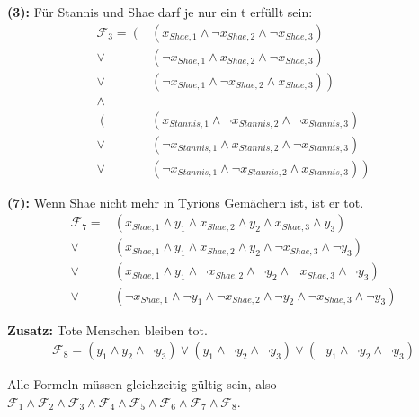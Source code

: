 \documentclass{article}
\begin{document}
\textbf{(3): }Für Stannis und Shae darf je nur ein t erfüllt sein:
\begin{align*}
\mathcal{F}_3 = \left(\right. & \left(x_{Shae,1} \wedge \neg x_{Shae,2} \wedge \neg x_{Shae,3} \right) \\ 
                         \vee & \left(\neg x_{Shae,1} \wedge x_{Shae,2} \wedge \neg x_{Shae,3} \right) \\ 
                         \vee & \left(\neg x_{Shae,1} \wedge \neg x_{Shae,2} \wedge x_{Shae,3} \right) \left.\right)\\
                       \wedge & \\
                \left(\right. & \left(x_{Stannis,1} \wedge \neg x_{Stannis,2} \wedge \neg x_{Stannis,3} \right) \\ 
                         \vee & \left(\neg x_{Stannis,1} \wedge x_{Stannis,2} \wedge \neg x_{Stannis,3} \right) \\ 
                         \vee & \left(\neg x_{Stannis,1} \wedge \neg x_{Stannis,2} \wedge x_{Stannis,3} \right) \left.\right)
\end{align*}

\textbf{(7): }Wenn Shae nicht mehr in Tyrions Gemächern ist, ist er tot.
\begin{align*}
\mathcal{F}_7 = & \left(x_{Shae,1} \wedge y_1 \wedge x_{Shae,2} \wedge y_2 \wedge x_{Shae,3} \wedge y_3 \right) \\
           \vee & \left(x_{Shae,1} \wedge y_1 \wedge x_{Shae,2} \wedge y_2 \wedge \neg x_{Shae,3} \wedge \neg y_3 \right) \\
           \vee & \left(x_{Shae,1} \wedge y_1 \wedge \neg x_{Shae,2} \wedge \neg y_2 \wedge \neg x_{Shae,3} \wedge \neg y_3 \right) \\
           \vee & \left(\neg x_{Shae,1} \wedge \neg y_1 \wedge \neg x_{Shae,2} \wedge \neg y_2 \wedge \neg x_{Shae,3} \wedge \neg y_3 \right)
\end{align*}

\textbf{Zusatz: }Tote Menschen bleiben tot.
\begin{align*}
\mathcal{F}_8 = \left(y_1 \wedge y_2 \wedge \neg y_3\right) \vee \left(y_1 \wedge \neg y_2 \wedge \neg y_3\right) \vee \left(\neg y_1 \wedge \neg y_2 \wedge \neg y_3\right)
\end{align*}


Alle Formeln müssen gleichzeitig gültig sein, also $\mathcal{F}_1 \wedge \mathcal{F}_2 \wedge \mathcal{F}_3 \wedge \mathcal{F}_4 \wedge \mathcal{F}_5 \wedge \mathcal{F}_6 \wedge \mathcal{F}_7 \wedge \mathcal{F}_8$.
\end{document}
